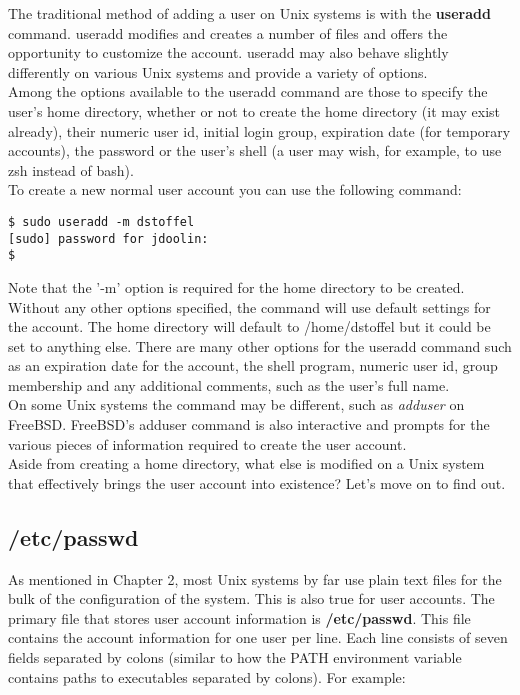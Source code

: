 The traditional method of adding a user on Unix systems is with the \textbf{useradd} command.  useradd modifies and creates a number of files and offers the opportunity to customize the account.  useradd may also behave slightly differently on various Unix systems and provide a variety of options.\\

Among the options available to the useradd command are those to specify the user's home directory, whether or not to create the home directory (it may exist already), their numeric user id, initial login group, expiration date (for temporary accounts), the password or the user's shell (a user may wish, for example, to use zsh instead of bash).\\

To create a new normal user account you can use the following command:

\begin{verbatim}
$ sudo useradd -m dstoffel
[sudo] password for jdoolin:
$ 
\end{verbatim}

Note that the '-m' option is required for the home directory to be created.  Without any other options specified, the command will use default settings for the account.  The home directory will default to /home/dstoffel but it could be set to anything else.  There are many other options for the useradd command such as an expiration date for the account, the shell program, numeric user id, group membership and any additional comments, such as the user's full name.\\

On some Unix systems the command may be different, such as \textit{adduser} on FreeBSD.  FreeBSD's adduser command is also interactive and prompts for the various pieces of information required to create the user account.\\

Aside from creating a home directory, what else is modified on a Unix system that effectively brings the user account into existence?  Let's move on to find out.

\subsection{/etc/passwd}

As mentioned in Chapter 2, most Unix systems by far use plain text files for the bulk of the configuration of the system.  This is also true for user accounts.  The primary file that stores user account information is \textbf{/etc/passwd}.  This file contains the account information for one user per line.  Each line consists of seven fields separated by colons (similar to how the PATH environment variable contains paths to executables separated by colons). For example:\\

